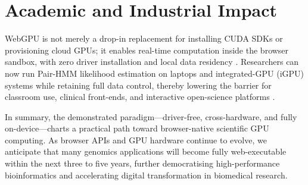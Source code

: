 \documentclass[PhD]{PHlab-thesis}
\begin{document}
\section{Academic and Industrial Impact}

WebGPU is not merely a drop-in replacement for installing CUDA SDKs or provisioning cloud GPUs; it enables real-time computation inside the browser sandbox, with zero driver installation and local data residency \cite{W3C2024-webgpu}.  
Researchers can now run Pair-HMM likelihood estimation on laptops and integrated-GPU (iGPU) systems while retaining full data control, thereby lowering the barrier for classroom use, clinical front-ends, and interactive open-science platforms \cite{Chrome2024-blog}.

In summary, the demonstrated paradigm—driver-free, cross-hardware, and fully on-device—charts a practical path toward browser-native scientific GPU computing.  
As browser APIs and GPU hardware continue to evolve, we anticipate that many genomics applications will become fully web-executable within the next three to five years, further democratising high-performance bioinformatics and accelerating digital transformation in biomedical research.




\newpage
{}
\printbibliography[
  heading=bibintoc,
  title={Reference}
]
\end{document}
